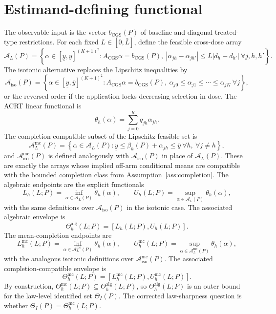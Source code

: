 \documentclass[11pt]{article}
\theoremstyle{definition}
\theoremstyle{plain}
\theoremstyle{remark}
\begin{document}
\section{Estimand-defining functional}
The observable input is the vector \(b_{\mathrm{CGS}}(P)\) of baseline and
diagonal treated-type restrictions.  For each fixed \(L\in[0,\bar L]\), define
the feasible cross-dose array
\[
  \mathcal A_L(P)=
  \left\{\alpha\in[\underline y,\overline y]^{(K+1)^2}:
    A_{\mathrm{CGS}}\alpha=b_{\mathrm{CGS}}(P),\
    |\alpha_{j h}-\alpha_{j h'}|\le L|d_h-d_{h'}|
    \ \forall j,h,h'
  \right\}.
\]
The isotonic alternative replaces the Lipschitz inequalities by
\[
  \mathcal A_{\mathrm{iso}}(P)=
  \left\{\alpha\in[\underline y,\overline y]^{(K+1)^2}:
    A_{\mathrm{CGS}}\alpha=b_{\mathrm{CGS}}(P),\
    \alpha_{j0}\le\alpha_{j1}\le\cdots\le\alpha_{jK}
    \ \forall j
  \right\},
\]
or the reversed order if the application locks decreasing selection in dose.
The ACRT linear functional is
\[
  \theta_h(\alpha)=\sum_{j=0}^K q_{jh}\alpha_{jh}.
\]
The completion-compatible subset of the Lipschitz feasible set is
\[
  \mathcal A_L^{\mathrm{mc}}(P)=
  \left\{\alpha\in\mathcal A_L(P):
    \underline y\le \beta_h(P)+\alpha_{jh}\le \overline y
    \ \forall h,\ \forall j\neq h
  \right\},
\]
and \(\mathcal A_{\mathrm{iso}}^{\mathrm{mc}}(P)\) is defined analogously with
\(\mathcal A_{\mathrm{iso}}(P)\) in place of \(\mathcal A_L(P)\).  These are
exactly the arrays whose implied off-arm conditional means are compatible with
the bounded completion class from Assumption~\ref{ass:completion}.
The algebraic endpoints are the explicit functionals
\[
  L_h(L;P)=\inf_{\alpha\in\mathcal A_L(P)} \theta_h(\alpha), \qquad
  U_h(L;P)=\sup_{\alpha\in\mathcal A_L(P)} \theta_h(\alpha),
\]
with the same definitions over \(\mathcal A_{\mathrm{iso}}(P)\) in the isotonic
case.  The associated algebraic envelope is
\[
  \Theta_h^{\mathrm{alg}}(L;P)=[L_h(L;P),U_h(L;P)].
\]
The mean-completion endpoints are
\[
  L_h^{\mathrm{mc}}(L;P)=\inf_{\alpha\in\mathcal A_L^{\mathrm{mc}}(P)}
  \theta_h(\alpha), \qquad
  U_h^{\mathrm{mc}}(L;P)=\sup_{\alpha\in\mathcal A_L^{\mathrm{mc}}(P)}
  \theta_h(\alpha),
\]
with the analogous isotonic definitions over
\(\mathcal A_{\mathrm{iso}}^{\mathrm{mc}}(P)\).  The associated
completion-compatible envelope is
\[
  \Theta_h^{\mathrm{mc}}(L;P)=
  [L_h^{\mathrm{mc}}(L;P),U_h^{\mathrm{mc}}(L;P)].
\]
By construction,
\(\Theta_h^{\mathrm{mc}}(L;P)\subseteq\Theta_h^{\mathrm{alg}}(L;P)\), so
\(\Theta_h^{\mathrm{alg}}(L;P)\) is an outer bound for the law-level
identified set \(\Theta_I(P)\).  The corrected law-sharpness question is
whether \(\Theta_I(P)=\Theta_h^{\mathrm{mc}}(L;P)\).
\end{document}
